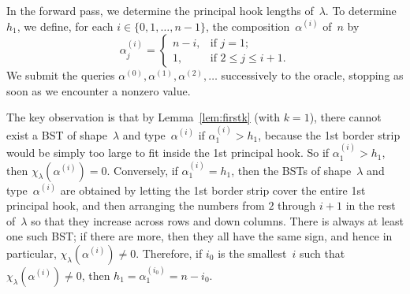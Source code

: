 \documentclass[12pt]{article}
\theoremstyle{definition}
\begin{document}
In the forward pass, we determine the
principal hook lengths of~$\lambda$.
To determine~$h_1$, we define, for each $i\in \{0,1,\ldots,n-1\}$,
the composition~$\alpha^{(i)}$ of~$n$ by
\begin{equation*}
\alpha^{(i)}_j =
\begin{cases}
n - i, &\mbox{if $j=1$;}\\
1, &\mbox{if $2 \le j \le i+1$.}
\end{cases}
\end{equation*}
We submit the queries
$\alpha^{(0)}, \alpha^{(1)}, \alpha^{(2)}, \ldots$
successively to the oracle,
stopping as soon as we encounter a nonzero value.


The key observation is that by Lemma~\ref{lem:firstk} (with $k=1$),
there cannot exist a BST
of shape~$\lambda$ and type~$\alpha^{(i)}$
if $\alpha^{(i)}_1 > h_1$,
because the 1st border strip would be simply too large
to fit inside the 1st principal hook.
So if $\alpha^{(i)}_1 > h_1$,
then $\chi_\lambda(\alpha^{(i)}) = 0$.
Conversely, if $\alpha^{(i)}_1 = h_1$,
then the BSTs of shape~$\lambda$ and type~$\alpha^{(i)}$
are obtained by letting the 1st border strip
cover the entire 1st principal hook,
and then arranging the numbers from $2$ through $i+1$
in the rest of~$\lambda$ so that they increase across rows and down columns.
There is always at least one such BST;
if there are more, then they all have the same sign,
and hence in particular, $\chi_\lambda(\alpha^{(i)}) \ne 0$.
Therefore, if $i_0$ is the smallest~$i$ such that
$\chi_\lambda(\alpha^{(i)}) \ne 0$,
then $h_1 = \alpha^{(i_0)}_1 =  n - i_0$.
\end{document}
